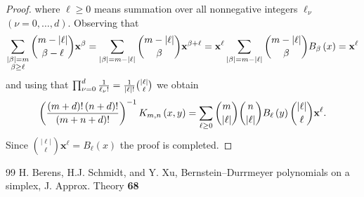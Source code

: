 \documentclass[10pt,a4paper]{amsart}
\begin{document}
\begin{proof}
where $\ell \geq 0$ means summation over all nonnegative integers $\ell
_{\nu }$ $\left( \nu =0,\ldots ,d\right) $. Observing that 
\begin{equation*}
\sum_{\substack{ \left\vert \beta \right\vert =m \\ \beta \geq \ell }}{%
\binom{m-\left\vert \ell \right\vert }{\beta -\ell }}\mathbf{x}^{\beta
}=\sum_{\left\vert \beta \right\vert =m-\left\vert \ell \right\vert }{\binom{%
m-\left\vert \ell \right\vert }{\beta }}\mathbf{x}^{\beta +\ell }=\mathbf{x}%
^{\ell }\sum_{\left\vert \beta \right\vert =m-\left\vert \ell \right\vert }{%
\binom{m-\left\vert \ell \right\vert }{\beta }}B_{\beta }\left( x\right) =%
\mathbf{x}^{\ell }
\end{equation*}%
and using that $\prod_{\nu =0}^{d}\frac{1}{\ell _{\nu }!}=\frac{1}{%
\left\vert \ell \right\vert !}\binom{\left\vert \ell \right\vert }{\ell }$
we obtain 
\begin{equation*}
\left( \frac{\left( m+d\right) !\left( n+d\right) !}{\left( m+n+d\right) !}%
\right) ^{-1}K_{m,n}\left( x,y\right) =\sum_{\ell \geq 0}\binom{m}{%
\left\vert \ell \right\vert }\binom{n}{\left\vert \ell \right\vert }B_{\ell
}\left( y\right) \binom{\left\vert \ell \right\vert }{\ell }\mathbf{x}^{\ell
}.
\end{equation*}%
Since $\binom{\left\vert \ell \right\vert }{\ell }\mathbf{x}^{\ell }=B_{\ell
}\left( x\right) $ the proof is completed.
\end{proof}

\begin{thebibliography}{99}
 H. Berens, H.J. Schmidt, and Y. Xu, Bernstein--Durrmeyer polynomials on a simplex, J. Approx. Theory \textbf{68}%
\end{thebibliography}
\end{document}
